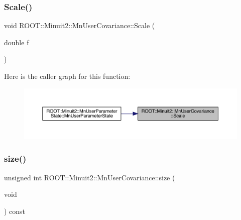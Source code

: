 \subsubsection{\texorpdfstring{Scale()}{Scale()}\hspace{0.1cm}{\footnotesize\ttfamily [2/2]}}
{\footnotesize\ttfamily void R\+O\+O\+T\+::\+Minuit2\+::\+Mn\+User\+Covariance\+::\+Scale (\begin{DoxyParamCaption}\item[{double}]{f }\end{DoxyParamCaption})\hspace{0.3cm}{\ttfamily [inline]}}

Here is the caller graph for this function\+:\nopagebreak
\begin{figure}[H]
\begin{center}
\leavevmode
\includegraphics[width=350pt]{d4/d72/classROOT_1_1Minuit2_1_1MnUserCovariance_ab94f947af8cd0dbff661baa69b429ae3_icgraph}
\end{center}
\end{figure}
\mbox{\label{classROOT_1_1Minuit2_1_1MnUserCovariance_ab15b9a83170c4e1bda1c22634fe020f5}} 
\subsubsection{\texorpdfstring{size()}{size()}\hspace{0.1cm}{\footnotesize\ttfamily [1/2]}}
{\footnotesize\ttfamily unsigned int R\+O\+O\+T\+::\+Minuit2\+::\+Mn\+User\+Covariance\+::size (\begin{DoxyParamCaption}\item[{void}]{ }\end{DoxyParamCaption}) const\hspace{0.3cm}{\ttfamily [inline]}}

\mbox{\label{classROOT_1_1Minuit2_1_1MnUserCovariance_ab15b9a83170c4e1bda1c22634fe020f5}} 
